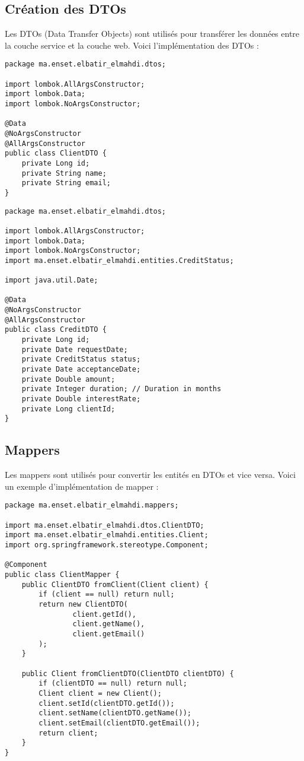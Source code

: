 \subsection{Création des DTOs}
Les DTOs (Data Transfer Objects) sont utilisés pour transférer les données entre la couche service et la couche web. Voici l'implémentation des DTOs :

\begin{lstlisting}[caption=DTO pour Client]
package ma.enset.elbatir_elmahdi.dtos;

import lombok.AllArgsConstructor;
import lombok.Data;
import lombok.NoArgsConstructor;

@Data
@NoArgsConstructor
@AllArgsConstructor
public class ClientDTO {
    private Long id;
    private String name;
    private String email;
}
\end{lstlisting}

\begin{lstlisting}[caption=DTO pour Credit]
package ma.enset.elbatir_elmahdi.dtos;

import lombok.AllArgsConstructor;
import lombok.Data;
import lombok.NoArgsConstructor;
import ma.enset.elbatir_elmahdi.entities.CreditStatus;

import java.util.Date;

@Data
@NoArgsConstructor
@AllArgsConstructor
public class CreditDTO {
    private Long id;
    private Date requestDate;
    private CreditStatus status;
    private Date acceptanceDate;
    private Double amount;
    private Integer duration; // Duration in months
    private Double interestRate;
    private Long clientId;
}
\end{lstlisting}

\subsection{Mappers}
Les mappers sont utilisés pour convertir les entités en DTOs et vice versa. Voici un exemple d'implémentation de mapper :

\begin{lstlisting}[caption=Mapper pour Client]
package ma.enset.elbatir_elmahdi.mappers;

import ma.enset.elbatir_elmahdi.dtos.ClientDTO;
import ma.enset.elbatir_elmahdi.entities.Client;
import org.springframework.stereotype.Component;

@Component
public class ClientMapper {
    public ClientDTO fromClient(Client client) {
        if (client == null) return null;
        return new ClientDTO(
                client.getId(),
                client.getName(),
                client.getEmail()
        );
    }

    public Client fromClientDTO(ClientDTO clientDTO) {
        if (clientDTO == null) return null;
        Client client = new Client();
        client.setId(clientDTO.getId());
        client.setName(clientDTO.getName());
        client.setEmail(clientDTO.getEmail());
        return client;
    }
}
\end{lstlisting}

